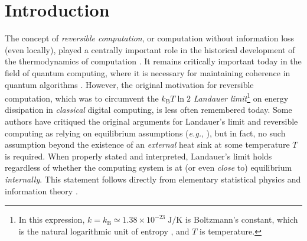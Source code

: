 \documentclass[preprints,article,accept,moreauthors,pdftex]{Definitions/mdpi}
\begin{document}



\section{Introduction}
\label{sec:intro}
The concept of \emph{reversible computation}, or computation without information loss (even locally), played a centrally important role in the historical development of the thermodynamics of computation \cite{Lan61,Ben73,Ben82,BL85,Lan87,Ben88,Ben03}. It remains critically important today in the field of quantum computing, where it is necessary for maintaining coherence in quantum algorithms \cite{NC00}. However, the original motivation for reversible computation, which was to circumvent the $k_{\mathrm{B}}T\ln 2$ \emph{Landauer limit}\footnote{In this expression, $k=k_\mathrm{B}\simeq 1.38\times 10^{-23}\;\mathrm{J}/\mathrm{K}$ is Boltzmann's constant, which is the natural logarithmic unit of entropy \cite{Fra05}, and $T$ is temperature.} on energy dissipation in \emph{classical} digital computing, is less often remembered today. Some authors have critiqued the original arguments for Landauer's limit and reversible computing as relying on equilibrium assumptions (\emph{e.g.}, \cite{Wol19a}), but in fact, no such assumption beyond the existence of an \emph{external} heat sink at some temperature $T$ is required. When properly stated and interpreted, Landauer's limit holds regardless of whether the computing system is at (or even \emph{close} to) equilibrium \emph{internally}. This statement follows directly from elementary statistical physics and information theory \cite{Fra18}. 
\end{document}

